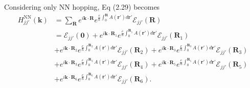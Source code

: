 \documentclass{report}
\begin{document}
Considering only \ac{NN} hopping, Eq (2.29) becomes
\begin{equation}
	\begin{aligned}
		H_{jj'}^{\text{NN}}(\mathbf{k})
		 & = \sum_{\mathbf{R}} e^{i\mathbf{k\cdot R}} e^{\frac{e}{\hbar}\int_{0}^{\mathbf{R}}A(\mathbf{r'})d\mathbf{r'}} \mathcal{E}_{jj'}(\mathbf{R})                                                                                                                                                 \\
		 & = \mathcal{E}_{jj'}(\mathbf{0}) + e^{i\mathbf{k\cdot}\mathbf{R}_{1} }e^{\frac{e}{\hbar}\int_{0}^{\mathbf{R}_{1}}A(\mathbf{r'})d\mathbf{r'}} \mathcal{E}_{jj'}(\mathbf{R}_{1})                                                                                                               \\
		 & + e^{i\mathbf{k\cdot}\mathbf{R}_{2} }e^{\frac{e}{\hbar}\int_{0}^{\mathbf{R}_{2}}A(\mathbf{r'})d\mathbf{r'}} \mathcal{E}_{jj'}(\mathbf{R}_{2}) + e^{i\mathbf{k\cdot}\mathbf{R}_{3} }e^{\frac{e}{\hbar}\int_{0}^{\mathbf{R}_{3}}A(\mathbf{r'})d\mathbf{r'}} \mathcal{E}_{jj'}(\mathbf{R}_{3}) \\
		 & + e^{i\mathbf{k\cdot}\mathbf{R}_{3} }e^{\frac{e}{\hbar}\int_{0}^{\mathbf{R}_{3}}A(\mathbf{r'})d\mathbf{r'}} \mathcal{E}_{jj'}(\mathbf{R}_{4}) + e^{i\mathbf{k\cdot}\mathbf{R}_{5} }e^{\frac{e}{\hbar}\int_{0}^{\mathbf{R}_{5}}A(\mathbf{r'})d\mathbf{r'}} \mathcal{E}_{jj'}(\mathbf{R}_{5}) \\
		 & + e^{i\mathbf{k\cdot}\mathbf{R}_{6} }e^{\frac{e}{\hbar}\int_{0}^{\mathbf{R}_{6}}A(\mathbf{r'})d\mathbf{r'}} \mathcal{E}_{jj'}(\mathbf{R}_{6}).
	\end{aligned}
\end{equation}
\end{document}
